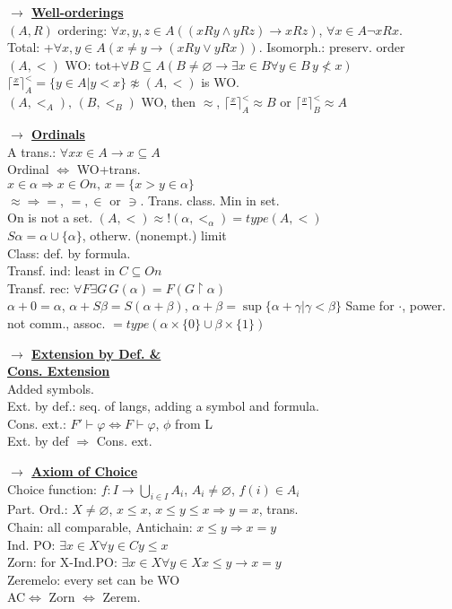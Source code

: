 \documentclass[9pt]{article}
\newcommand{\mytitle}[1]{ {\bf $\rightarrow$ \underline{#1}}\\}
\begin{document}
\begin{multicols*}{2}
\mytitle{Well-orderings}
$(A,R)$ ordering: $\forall x,y,z\in A\left((xRy\wedge yRz)\to xRz\right)$,
$\forall x\in A\neg xRx$.\\
Total: +$\forall x,y\in A\left(x\neq y\to(xRy\vee yRx)\right)$.
Isomorph.: preserv. order\\
$(A,<)$ WO: tot+$\forall B\subseteq A\left(B\neq \varnothing\to \exists x\in B\forall y\in B\,y\nless x\right)$\\
$\lceil \frac{x}{\,}\rceil_A^<=\{y\in A|y<x\}\not\approx (A,<)$ is WO.\\
$(A,<_A),\,(B,<_B)$ WO, then $\approx$, $\lceil \frac{x}{\,}\rceil_A^<\approx B$ or $\lceil \frac{x}{\,}\rceil_B^<\approx A$

\mytitle{Ordinals}
A trans.: $\forall x x\in A\to x\subseteq A$\\
Ordinal $\Leftrightarrow$ WO+trans.\\
$x\in \alpha\Rightarrow x\in On,\,x=\{x>y\in \alpha\}$\\
$\approx\Rightarrow=$, $=,\in$ or $\ni$. Trans. class. Min in set.\\
On is not a set. $(A,<)\approx !(\alpha,<_\alpha)=type(A,<)$\\
$S\alpha=\alpha\cup\{\alpha\}$, otherw. (nonempt.) limit\\
Class: def. by formula.\\
Transf. ind: least in $C\subseteq On$\\
Transf. rec: $\forall F\exists G\,G(\alpha)=F(G\upharpoonright\alpha)$\\
$\alpha+0=\alpha$, $\alpha+S\beta=S(\alpha+\beta)$, $\alpha+\beta=\sup\{\alpha+\gamma|\gamma<\beta\}$
Same for $\cdot$, power.\\
not comm., assoc. $=type(\alpha\times\{0\}\cup\beta\times\{1\})$

\mytitle{Extension by Def. \&\\ Cons. Extension}
Added symbols.\\
Ext. by def.: seq. of langs, adding a symbol and formula.\\
Cons. ext.: $F'\vdash \varphi\Leftrightarrow F\vdash\varphi$, $\phi$ from L\\
Ext. by def $\Rightarrow$ Cons. ext.

\mytitle{Axiom of Choice}
Choice function: $f\colon I\to \bigcup\limits_{i\in I}A_i$, $A_i\neq\varnothing$, $f(i)\in A_i$\\
Part. Ord.: $X\neq\varnothing$, $x\leqslant x$, $x\leqslant y\leqslant x\Rightarrow y=x$, trans.\\
Chain: all comparable, Antichain: $x\leqslant y\Rightarrow x=y$\\
Ind. PO: $\exists x\in X\forall y\in C y\leqslant x$\\
Zorn: for X-Ind.PO: $\exists x\in X\forall y\in X x\leqslant y\rightarrow x=y$\\
Zeremelo: every set can be WO\\
AC$\Leftrightarrow$ Zorn $\Leftrightarrow$ Zerem.


\end{multicols*}
\end{document}
